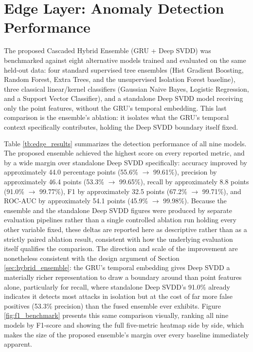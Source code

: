 \section{Edge Layer: Anomaly Detection Performance}\label{sec:edge_eval}

The proposed Cascaded Hybrid Ensemble (GRU + Deep SVDD) was benchmarked against eight alternative models trained and evaluated on the same held-out data: four standard supervised tree ensembles (Hist Gradient Boosting, Random Forest, Extra Trees, and the unsupervised Isolation Forest baseline), three classical linear/kernel classifiers (Gaussian Naive Bayes, Logistic Regression, and a Support Vector Classifier), and a standalone Deep SVDD model receiving only the point features, without the GRU's temporal embedding. This last comparison is the ensemble's ablation: it isolates what the GRU's temporal context specifically contributes, holding the Deep SVDD boundary itself fixed.

Table \ref{tb:edge_results} summarizes the detection performance of all nine models. The proposed ensemble achieved the highest score on every reported metric, and by a wide margin over standalone Deep SVDD specifically: accuracy improved by approximately 44.0 percentage points (55.6\% $\to$ 99.61\%), precision by approximately 46.4 points (53.3\% $\to$ 99.65\%), recall by approximately 8.8 points (91.0\% $\to$ 99.77\%), F1 by approximately 32.5 points (67.2\% $\to$ 99.71\%), and ROC-AUC by approximately 54.1 points (45.9\% $\to$ 99.98\%). Because the ensemble and the standalone Deep SVDD figures were produced by separate evaluation pipelines rather than a single controlled ablation run holding every other variable fixed, these deltas are reported here as descriptive rather than as a strictly paired ablation result, consistent with how the underlying evaluation itself qualifies the comparison. The direction and scale of the improvement are nonetheless consistent with the design argument of Section \ref{sec:hybrid_ensemble}: the GRU's temporal embedding gives Deep SVDD a materially richer representation to draw a boundary around than point features alone, particularly for recall, where standalone Deep SVDD's 91.0\% already indicates it detects most attacks in isolation but at the cost of far more false positives (53.3\% precision) than the fused ensemble ever exhibits. Figure \ref{fig:f1_benchmark} presents this same comparison visually, ranking all nine models by F1-score and showing the full five-metric heatmap side by side, which makes the size of the proposed ensemble's margin over every baseline immediately apparent.

